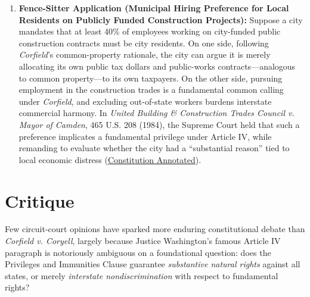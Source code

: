 \documentclass[12pt]{article}
\begin{document}
\begin{enumerate}
\item \textbf{Fence-Sitter Application (Municipal Hiring Preference for Local Residents on Publicly Funded Construction Projects):} Suppose a city mandates that at least 40\% of employees working on city-funded public construction contracts must be city residents. On one side, following \textit{Corfield}'s common-property rationale, the city can argue it is merely allocating its own public tax dollars and public-works contracts---analogous to common property---to its own taxpayers. On the other side, pursuing employment in the construction trades is a fundamental common calling under \textit{Corfield}, and excluding out-of-state workers burdens interstate commercial harmony. In \textit{United Building \& Construction Trades Council v. Mayor of Camden}, 465 U.S. 208 (1984), the Supreme Court held that such a preference implicates a fundamental privilege under Article IV, while remanding to evaluate whether the city had a ``substantial reason'' tied to local economic distress (\href{https://constitution.congress.gov/browse/essay/artIV-S2-C1-7/ALDE_00013783/}{Constitution Annotated}).
\end{enumerate}

\section{Critique}

Few circuit-court opinions have sparked more enduring constitutional debate than \textit{Corfield v. Coryell}, largely because Justice Washington's famous Article IV paragraph is notoriously ambiguous on a foundational question: does the Privileges and Immunities Clause guarantee \textit{substantive natural rights} against all states, or merely \textit{interstate nondiscrimination} with respect to fundamental rights?
\end{document}
